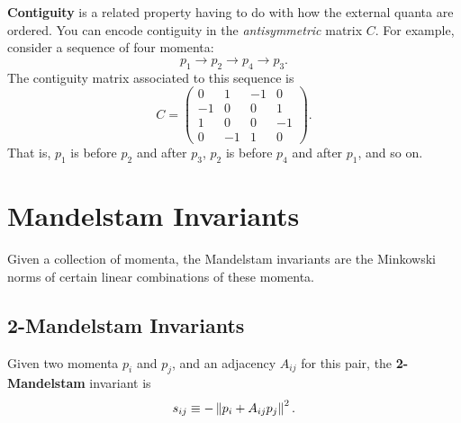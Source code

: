 \textbf{Contiguity} is a related property having to do with how the external quanta are ordered. You can encode contiguity in the \textit{antisymmetric} matrix $C$. For example, consider a sequence of four momenta:
\begin{equation}
	p_{1} \rightarrow p_{2} \rightarrow p_{4} \rightarrow p_{3}.
\end{equation}
The contiguity matrix associated to this sequence is
\begin{equation}
	C = \begin{pmatrix} 0 & 1 & -1 & 0 \\ -1 & 0 & 0 & 1 \\ 1 & 0 & 0 & -1 \\ 0 & -1 & 1 & 0 \end{pmatrix}.
\end{equation}
That is, $p_{1}$ is before $p_{2}$ and after $p_{3}$, $p_{2}$ is before $p_{4}$ and after $p_{1}$, and so on.
\section{Mandelstam Invariants}
Given a collection of momenta, the Mandelstam invariants are the Minkowski norms of certain linear combinations of these momenta.
\subsection{2-Mandelstam Invariants}
Given two momenta $p_{i}$ and $p_{j}$, and an adjacency $A_{ij}$ for this pair, the \textbf{2-Mandelstam} invariant is
\begin{equation}
	s_{ij} \equiv -\left\Vert p_{i} + A_{ij} p_{j} \right\Vert^{2}.
\end{equation}
